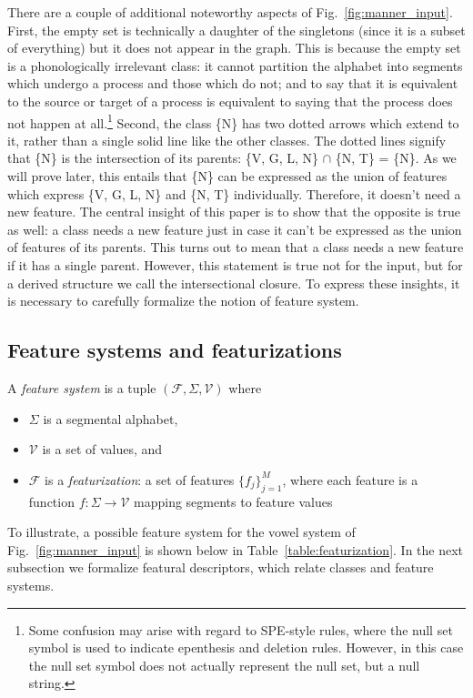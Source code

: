 \documentclass[11pt, oneside]{article}   	%
\begin{document}
There are a couple of additional noteworthy aspects of Fig.~\ref{fig:manner_input}. First, the empty set is technically a daughter of the singletons (since it is a subset of everything) but it does not appear in the graph. This is because the empty set is a phonologically irrelevant class: it cannot partition the alphabet into segments which undergo a process and those which do not; and to say that it is equivalent to the source or target of a process is equivalent to saying that the process does not happen at all.\footnote{Some confusion may arise with regard to SPE-style rules, where the null set symbol is used to indicate epenthesis and deletion rules. However, in this case the null set symbol does not actually represent the null set, but a null string.} Second, the class \{N\} has two dotted arrows which extend to it, rather than a single solid line like the other classes. The dotted lines signify that \{N\} is the intersection of its parents: \{V, G, L, N\} $\cap$ \{N, T\} = \{N\}. As we will prove later, this entails that \{N\} can be expressed as the union of features which express \{V, G, L, N\} and \{N, T\} individually. Therefore, it doesn't need a new feature. The central insight of this paper is to show that the opposite is true as well: a class needs a new feature just in case it can't be expressed as the union of features of its parents. This turns out to mean that a class needs a new feature if it has a single parent. However, this statement is true not for the input, but for a derived structure we call the intersectional closure. To express these insights, it is necessary to carefully formalize the notion of feature system.

\subsection{Feature systems and featurizations}

A \textit{feature system} is a tuple $(\mathcal F, \Sigma, \mathcal V)$ where \begin{itemize}
    \item $\Sigma$ is a segmental alphabet, 
    \item $\mathcal V$ is a set of values, and 
    \item $\mathcal F$ is a \textit{featurization}: a set of features $\{f_j\}_{j=1}^M$, where each feature is a function $f: \Sigma \rightarrow \mathcal V$ mapping segments to feature values
    \end{itemize}

\noindent To illustrate, a possible feature system for the vowel system of Fig.~\ref{fig:manner_input} is shown below in Table~\ref{table:featurization}. In the next subsection we formalize featural descriptors, which relate classes and feature systems.
\end{document}
